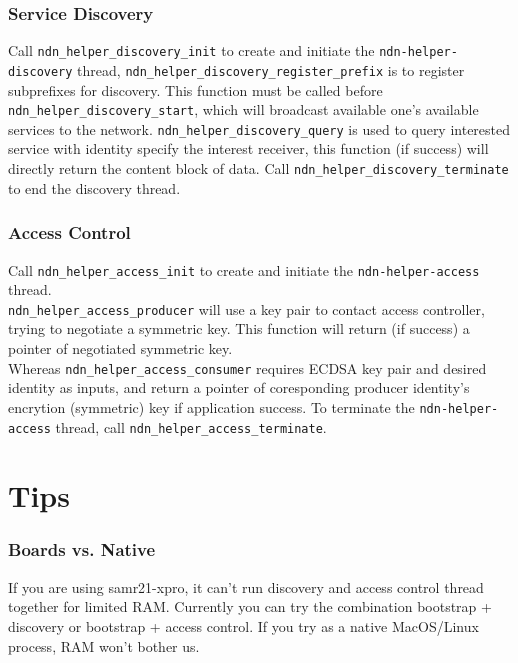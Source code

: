 \documentclass[a4paper, 11pt]{article}
\begin{document}
        \subsubsection*{Service Discovery}
        Call \texttt{ndn\_helper\_discovery\_init} to create and initiate the \texttt{ndn-helper-discovery} thread, \texttt{ndn\_helper\_discovery\_register\_prefix} is to register subprefixes for discovery. This function must be called before \texttt{ndn\_helper\_discovery\_start}, which will broadcast available one's available services to the network. \texttt{ndn\_helper\_discovery\_query} is used to query interested service with identity specify the interest receiver, this function (if success) will directly return the content block of data. Call \texttt{ndn\_helper\_discovery\_terminate}
        to end the discovery thread.
        
        \subsubsection*{Access Control}
        Call \texttt{ndn\_helper\_access\_init} to create and initiate the \texttt{ndn-helper-access} thread. \\ \texttt{ndn\_helper\_access\_producer} will use a key pair to contact access controller, trying to negotiate a symmetric key. This function will return (if success) a pointer of negotiated symmetric key.  \\ Whereas \texttt{ndn\_helper\_access\_consumer} requires ECDSA key pair and desired identity as inputs, and return a pointer of coresponding producer identity's encrytion (symmetric) key if application success. To terminate the \texttt{ndn-helper-access} thread, call \texttt{ndn\_helper\_access\_terminate}.             

        \section*{Tips}
        \subsubsection*{Boards vs. Native}
        If you are using samr21-xpro, it can't run discovery and access control thread together for limited RAM. Currently you can try the combination bootstrap + discovery or bootstrap + access control. If you try as a native MacOS/Linux process, RAM won't bother us.
        
\end{document}
